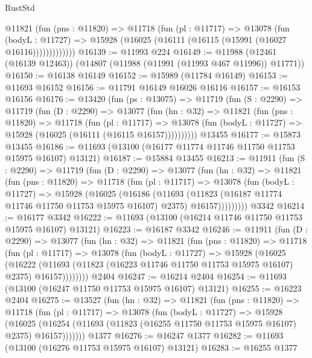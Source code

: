 \begin{lexlean}{RustStd}
\begin{coremodule}
            @11821
              (fun (pns : @11820) =>
              @11718
                (fun (pl : @11717) =>
                @13078
                  (fun (bodyL : @11727) =>
                  @15928 (@16025 (@16111 (@16115 (@15991 (@16027 @16116)))))))))))))
@16139 := @11993 @224
@16149 := @11988 (@12461 (@16139 @12463)) (@14807 (@11988 (@11991 (@11993 @467 @11996)) @11771))
@16150 := @16138 @16149
@16152 := @15989 (@11784 @16149)
@16153 := @11693 @16152
@16156 := @11791 @16149 @16026 @16116
@16157 := @16153 @16156
@16176 := @13420
    (fun (ps : @13075) =>
    @11719
      (fun (S : @2290) =>
      @11719
        (fun (D : @2290) =>
        @13077
          (fun (hn : @32) =>
          @11821
            (fun (pns : @11820) =>
            @11718
              (fun (pl : @11717) =>
              @13078 (fun (bodyL : @11727) => @15928 (@16025 (@16111 (@16115 @16157))))))))))
    @13455
@16177 := @15873 @13455
@16186 := @11693 (@13100 (@16177 @11774 @11746 @11750 @11753 @15975 @16107) @13121)
@16187 := @15884 @13455
@16213 := @11911
    (fun (S : @2290) =>
    @11719
      (fun (D : @2290) =>
      @13077
        (fun (hn : @32) =>
        @11821
          (fun (pns : @11820) =>
          @11718
            (fun (pl : @11717) =>
            @13078
              (fun (bodyL : @11727) =>
              @15928
                (@16025
                  (@16186
                    (@11693
                      (@11823 (@16187 @11774 @11746 @11750 @11753 @15975 @16107) @2375)
                      @16157)))))))))
    @3342
@16214 := @16177 @3342
@16222 := @11693 (@13100 (@16214 @11746 @11750 @11753 @15975 @16107) @13121)
@16223 := @16187 @3342
@16246 := @11911
    (fun (D : @2290) =>
    @13077
      (fun (hn : @32) =>
      @11821
        (fun (pns : @11820) =>
        @11718
          (fun (pl : @11717) =>
          @13078
            (fun (bodyL : @11727) =>
            @15928
              (@16025
                (@16222
                  (@11693 (@11823 (@16223 @11746 @11750 @11753 @15975 @16107) @2375) @16157))))))))
    @2404
@16247 := @16214 @2404
@16254 := @11693 (@13100 (@16247 @11750 @11753 @15975 @16107) @13121)
@16255 := @16223 @2404
@16275 := @13527
    (fun (hn : @32) =>
    @11821
      (fun (pns : @11820) =>
      @11718
        (fun (pl : @11717) =>
        @13078
          (fun (bodyL : @11727) =>
          @15928
            (@16025
              (@16254 (@11693 (@11823 (@16255 @11750 @11753 @15975 @16107) @2375) @16157)))))))
    @1377
@16276 := @16247 @1377
@16282 := @11693 (@13100 (@16276 @11753 @15975 @16107) @13121)
@16283 := @16255 @1377

\end{coremodule}
\end{lexlean}
